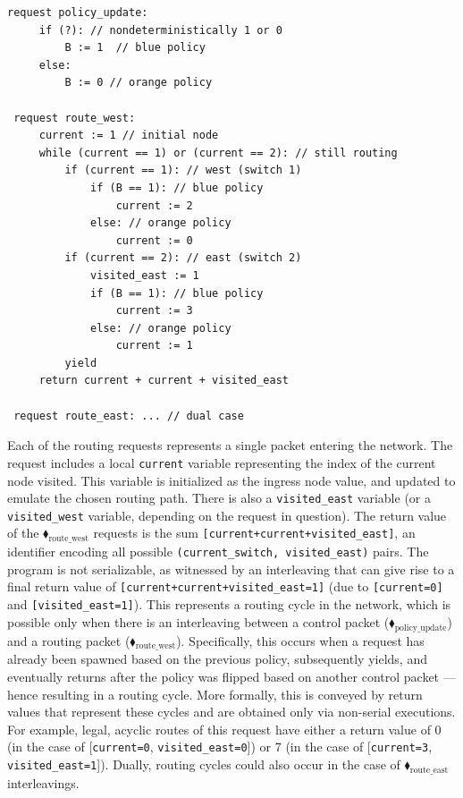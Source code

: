 \begin{center}
\begin{minipage}[!htbp]{1.0\textwidth}
	\begin{lstlisting}[caption={BGP routing (not serializable)},label={lst:BgpNonSerializable},numbers=none]
 request policy_update:
     if (?): // nondeterministically 1 or 0
         B := 1  // blue policy 
     else:
         B := 0 // orange policy
		
 request route_west:
     current := 1 // initial node
     while (current == 1) or (current == 2): // still routing        
         if (current == 1): // west (switch 1)
             if (B == 1): // blue policy
                 current := 2
             else: // orange policy
                 current := 0
         if (current == 2): // east (switch 2)
             visited_east := 1
             if (B == 1): // blue policy
                 current := 3
             else: // orange policy
                 current := 1
         yield
     return current + current + visited_east
     
 request route_east: ... // dual case      
		\end{lstlisting}
\end{minipage}
\end{center}


Each of the routing requests represents a single packet entering the network. The request includes a local \texttt{current} variable representing the index of the current node visited. This variable is initialized as the ingress node value, and updated to emulate the chosen routing path. There is also a \texttt{visited\_east} variable (or a \texttt{visited\_west} variable, depending on the request in question).
%
The return value of the {\color{ForestGreen}$\blacklozenge_\text{route\_west}$} requests is the sum \texttt{[current+current+visited\_east]}, an identifier encoding all possible \texttt{(current\_switch, visited\_east)} pairs.
%
The program is not serializable, as witnessed by an interleaving that can give rise to a final return value of \texttt{[current+current+visited\_east=1]} (due to \texttt{[current=0]} and \texttt{[visited\_east=1]}). This represents a routing cycle in the network, which is possible only when there is an interleaving between a control packet ({\color{ForestGreen}$\blacklozenge_\text{policy\_update}$}) and a routing packet ({\color{ForestGreen}$\blacklozenge_\text{route\_west}$}). Specifically, this occurs when a request has already been spawned based on the previous policy, subsequently yields, and eventually returns after the policy was flipped based on another control packet --- hence resulting in a routing cycle.
%
More formally, this is conveyed by return values that represent these cycles and are obtained only via non-serial executions. For example, legal, acyclic routes of this request have either a return value of 0 (in the case of [\texttt{current=0}, \texttt{visited\_east=0}]) or 7 (in the case of [\texttt{current=3}, \texttt{visited\_east=1}]).
Dually, routing cycles could also occur in the case of {\color{ForestGreen}$\blacklozenge_\text{route\_east}$} interleavings.


